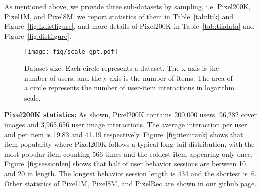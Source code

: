 \documentclass[sigconf]{acmart}
\begin{document}
		




		







As mentioned above, we provide three sub-datasets by sampling, i.e. Pixel200K, Pixel1M, and Pixel8M.  we  report statistics of them in Table~\ref{tab:ltik} and Figure~\ref{fig:Ldistfigure}, and more details of
Pixel200K in Table~\ref{tab:tikdata} and Figure~\ref{fig:distfigure}.



 \begin{figure}[t]
	\centering		\texttt{[image: fig/scale\_gpt.pdf]}
 \vspace{-0.8cm}
		\caption{Dataset size.
			Each circle represents a dataset. The x-axis is the number of users, and the y-axis is  the number of items. The area of a circle represents the number of user-item interactions in logarithm scale.}
		\label{fig:scale}
\end{figure}


\textbf{Pixel200K statistics:} As shown, Pixel200K contains 200,000 users, 96,282 cover images and 3,965,656 user image interactions. The average interaction per user and per item is 19.83  and 41.19 respectively.  
Figure~\ref{fig:itemrank} shows that item popularity where Pixel200K follows a typical long-tail distribution, with the most popular item counting 566 times and the coldest item appearing only once.  Figure~\ref{fig:sessionlen} shows that half of  user behavior sessions are between 10 and 20 in length. The longest behavior session length is  434 and the shortest is~6. Other statistics of Pixel1M, Pixel8M, and PixelRec are shown in our github page.
\end{document}

